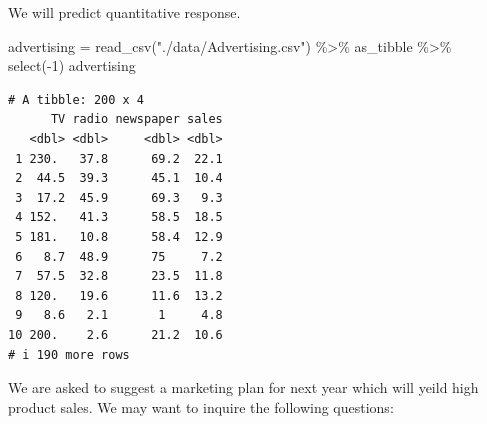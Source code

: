 \documentclass[
  letterpaper,
  DIV=11,
  numbers=noendperiod]{scrreprt}
\newenvironment{Shaded}{\begin{snugshade}}{\end{snugshade}}
\newcommand{\DecValTok}[1]{\textcolor[rgb]{0.68,0.00,0.00}{#1}}
\newcommand{\FunctionTok}[1]{\textcolor[rgb]{0.28,0.35,0.67}{#1}}
\newcommand{\NormalTok}[1]{\textcolor[rgb]{0.00,0.23,0.31}{#1}}
\newcommand{\OtherTok}[1]{\textcolor[rgb]{0.00,0.23,0.31}{#1}}
\newcommand{\SpecialCharTok}[1]{\textcolor[rgb]{0.37,0.37,0.37}{#1}}
\newcommand{\StringTok}[1]{\textcolor[rgb]{0.13,0.47,0.30}{#1}}
\begin{document}
We will predict quantitative response.

\begin{Shaded}
\begin{Highlighting}[]
\NormalTok{advertising }\OtherTok{=} \FunctionTok{read\_csv}\NormalTok{(}\StringTok{"./data/Advertising.csv"}\NormalTok{) }\SpecialCharTok{\%\textgreater{}\%}\NormalTok{ as\_tibble }\SpecialCharTok{\%\textgreater{}\%} \FunctionTok{select}\NormalTok{(}\SpecialCharTok{{-}}\DecValTok{1}\NormalTok{)}
\NormalTok{advertising}
\end{Highlighting}
\end{Shaded}

\begin{verbatim}
# A tibble: 200 x 4
      TV radio newspaper sales
   <dbl> <dbl>     <dbl> <dbl>
 1 230.   37.8      69.2  22.1
 2  44.5  39.3      45.1  10.4
 3  17.2  45.9      69.3   9.3
 4 152.   41.3      58.5  18.5
 5 181.   10.8      58.4  12.9
 6   8.7  48.9      75     7.2
 7  57.5  32.8      23.5  11.8
 8 120.   19.6      11.6  13.2
 9   8.6   2.1       1     4.8
10 200.    2.6      21.2  10.6
# i 190 more rows
\end{verbatim}

We are asked to suggest a marketing plan for next year which will yeild
high product sales. We may want to inquire the following questions:
\end{document}
